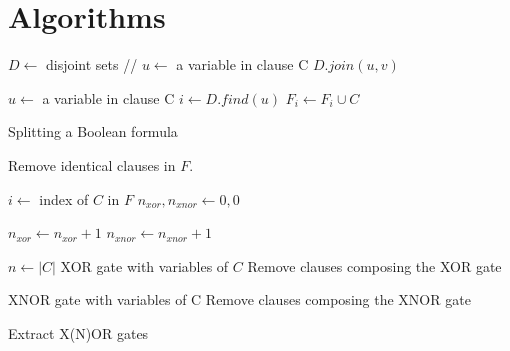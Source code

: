 \chapter{Algorithms}

\begin{algorithm}[h]
  \begin{algorithmic}

    \STATE $D \gets$ disjoint sets // \cite{Tarjan:1975:EGB:321879.321884}
      \STATE $u \gets$ a variable in clause C
        \STATE $D.join(u, v)$
      \ENDFOR
    \ENDFOR

      \STATE $u \gets$ a variable in clause C
      \STATE $i \gets D.find(u)$
      \STATE $F_i \gets F_i \cup C$
    \ENDFOR
  \end{algorithmic}

  \caption{Splitting a Boolean formula}
  \label{alg:split}
\end{algorithm}

\begin{algorithm}[h]
  \begin{algorithmic}

    \STATE Remove identical clauses in $F$.

      \STATE $i \gets$ index of $C$ in $F$
      \STATE $n_{xor}, n_{xnor} \gets 0, 0$

          \STATE $n_{xor} \gets n_{xor} + 1$
        \ELSE
          \STATE $n_{xnor} \gets n_{xnor} + 1$
        \ENDIF
      \ENDFOR

      \STATE $n \gets |C|$
        \PRINT XOR gate with variables of $C$
        \STATE Remove clauses composing the XOR gate
      \ENDIF

        \PRINT XNOR gate with variables of C
        \STATE Remove clauses composing the XNOR gate
      \ENDIF
    \ENDFOR
  \end{algorithmic}

  \caption{Extract X(N)OR gates}
  \label{alg:extract-xnor-gates}
\end{algorithm}

